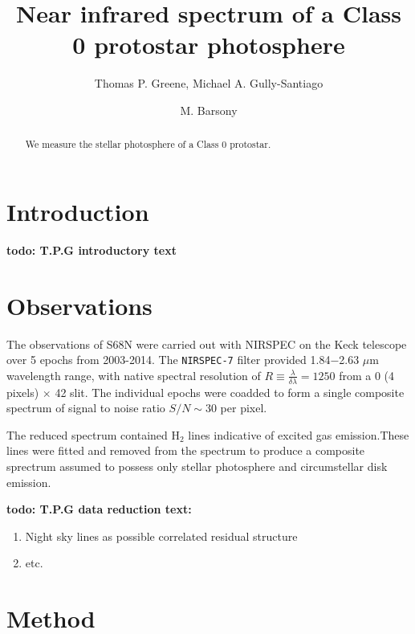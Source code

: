 \documentclass[twocolumn]{emulateapj}%
\begin{document}
 
\title{Near infrared spectrum of a Class 0 protostar photosphere}

\author{Thomas P. Greene, Michael A. Gully-Santiago}
\author{M. Barsony}

\begin{abstract}
We measure the stellar photosphere of a Class 0 protostar.
\end{abstract}


\maketitle


\section{Introduction}\label{sec:intro}

\textbf{todo: T.P.G introductory text}

\section{Observations}
The observations of S68N were carried out with NIRSPEC on the Keck telescope over 5 epochs from 2003-2014.  The \texttt{NIRSPEC-7} filter provided 1.84$-$2.63 $\mu$m wavelength range, with native spectral resolution of $R \equiv \frac{\lambda}{\delta \lambda} =1250$ from a 0 (4 pixels) $\times$ 42 slit.  The individual epochs were coadded to form a single composite spectrum of signal to noise ratio $S/N\sim30$ per pixel.

The reduced spectrum contained H$_2$ lines indicative of excited gas emission.These lines were fitted and removed from the spectrum to produce a composite sprectrum assumed to possess only stellar photosphere and circumstellar disk emission.

\textbf{todo: T.P.G data reduction text:}
\begin{enumerate}
	\item Night sky lines as possible correlated residual structure
	\item etc.
\end{enumerate}

\section{Method}
\end{document}
